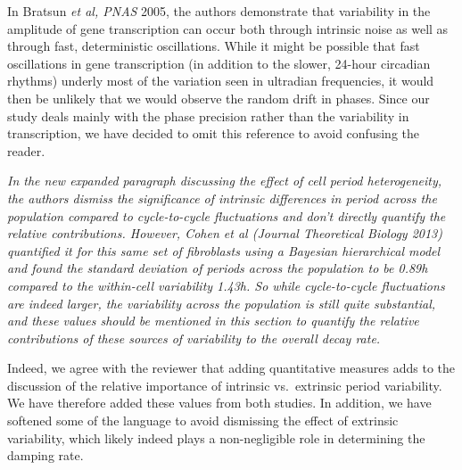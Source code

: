 \documentclass[11pt, letterpaper]{article}
\newenvironment{reviewer}{\itshape\color{gray}}{}
\begin{document}
In Bratsun {\itshape et al, PNAS} 2005, the authors demonstrate that variability in the amplitude of gene transcription can occur both through intrinsic noise as well as through fast, deterministic oscillations. While it might be possible that fast oscillations in gene transcription (in addition to the slower, 24-hour circadian rhythms) underly most of the variation seen in ultradian frequencies, it would then be unlikely that we would observe the random drift in phases. Since our study deals mainly with the phase precision rather than the variability in transcription, we have decided to omit this reference to avoid confusing the reader.

\begin{reviewer}
In the new expanded paragraph discussing the effect of cell period heterogeneity, the authors dismiss the significance of intrinsic differences in period across the population compared to cycle-to-cycle fluctuations and don't directly quantify the relative contributions. However, Cohen et al (Journal Theoretical Biology 2013) quantified it for this same set of fibroblasts using a Bayesian hierarchical model and found the standard deviation of periods across the population to be 0.89h compared to the within-cell variability 1.43h. So while cycle-to-cycle fluctuations are indeed larger, the variability across the population is still quite substantial, and these values should be mentioned in this section to quantify the relative contributions of these sources of variability to the overall decay rate.
\end{reviewer}

Indeed, we agree with the reviewer that adding quantitative measures adds to the discussion of the relative importance of intrinsic vs.\ extrinsic period variability. We have therefore added these values from both studies. In addition, we have softened some of the language to avoid dismissing the effect of extrinsic variability, which likely indeed plays a non-negligible role in determining the damping rate.
\end{document}
